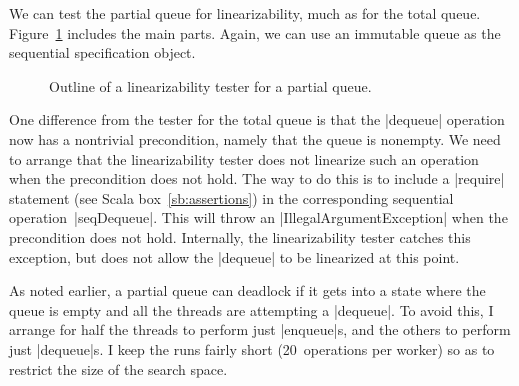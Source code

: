 
We can test the partial queue for linearizability, much as for the total
queue.  Figure~\ref{fig:partial-queue-lin-tester} includes the main parts.
Again, we can use an immutable queue as the sequential specification object.


\begin{figure}
\caption{Outline of a linearizability tester for a partial queue.}
\label{fig:partial-queue-lin-tester}
\end{figure}


One difference from the tester for the total queue is that the |dequeue|
operation now has a nontrivial precondition, namely that the queue is nonempty.
We need to arrange that the linearizability tester does not linearize such an
operation when the precondition does not hold.  The way to do this is to
include a |require| statement (see Scala box~\ref{sb:assertions}) in the
corresponding sequential operation~|seqDequeue|.  This will throw an
|IllegalArgumentException| when the precondition does not hold.  Internally,
the linearizability tester catches this exception, but does not allow the
|dequeue| to be linearized at this point.

As noted earlier, a partial queue can deadlock if it gets into a state where
the queue is empty and all the threads are attempting a |dequeue|.  To avoid
this, I arrange for half the threads to perform just |enqueue|s, and the
others to perform just |dequeue|s.  I keep the runs fairly short
(20~operations per worker) so as to restrict the size of the search space.


